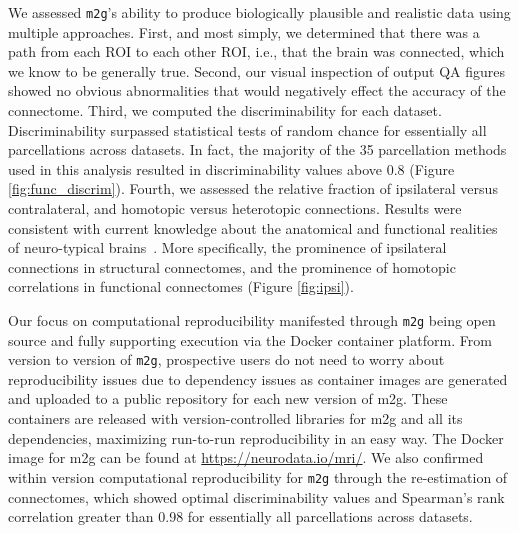 We assessed \texttt{m2g}'s ability to produce biologically plausible and realistic data using multiple approaches.  First, and most simply, we determined that there was a path from each ROI to each other ROI, i.e., that the brain was connected, which we know to be generally true. Second, our visual inspection of output QA figures showed no obvious abnormalities that would negatively effect the accuracy of the connectome. Third, we computed the discriminability for each dataset. Discriminability surpassed statistical tests of random chance for essentially all parcellations across datasets. In fact, the majority of the 35 parcellation methods used in this analysis resulted in discriminability values above 0.8 (Figure \ref{fig:func_discrim}). Fourth, we assessed the relative fraction of ipsilateral versus contralateral, and homotopic versus heterotopic connections. 
Results were consistent with current knowledge about the anatomical and functional realities of neuro-typical brains~\cite{ipsi-struct,Stark-ipsi,Biswal-ipsi,Zuo-ipsi}. More specifically, the prominence of ipsilateral connections in structural connectomes, and the prominence of homotopic correlations in functional connectomes (Figure \ref{fig:ipsi}).

Our focus on computational reproducibility manifested through \texttt{m2g} being open source and fully supporting execution via the Docker container platform. From version to version of \texttt{m2g}, prospective users do not need to worry about reproducibility issues due to dependency issues as container images are generated and uploaded to a public repository for each new version of m2g. These containers are released with version-controlled libraries for m2g and all its dependencies, maximizing run-to-run reproducibility in an easy way. The Docker image for m2g can be found at \url{https://neurodata.io/mri/}. We also confirmed within version computational reproducibility for \texttt{m2g} through the re-estimation of connectomes, which showed optimal discriminability values and Spearman's rank correlation greater than 0.98 for essentially all parcellations across datasets.


